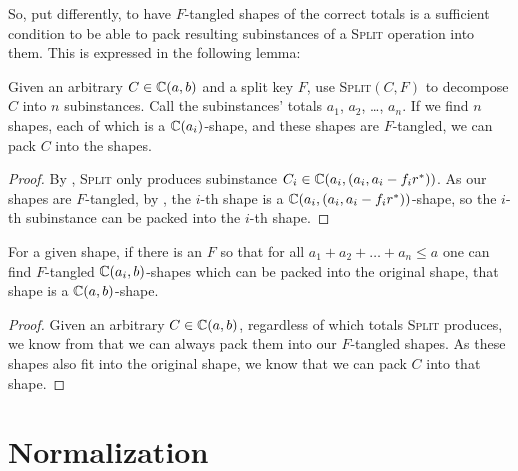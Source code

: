 \documentclass[%
    a4paper,              %
    style=screen,          %
    bibliography=totoc,   %
    nexus,                %
    lnum,                 %
    extramargin,          %
]{tubsbook}
\begin{document}
So, put differently, to have $F$-tangled shapes of the correct totals is a sufficient condition to be able to pack resulting subinstances of a \textsc{Split} operation into them. This is expressed in the following lemma:


\begin{lemma}\label{th:split-tangle}
    Given an arbitrary $C \in \mathbb{C}(a,b)$ and a split key $F$, use \textsc{Split}$(C,F)$ to decompose $C$ into $n$ subinstances. Call the subinstances' totals $a_1$, $a_2$, \dots, $a_n$. If we find $n$ shapes, each of which is a $\mathbb{C}(a_i)$-shape, and these shapes are $F$-tangled, we can pack $C$ into the shapes.
\end{lemma}

\begin{proof}
    By , \textsc{Split} only produces subinstance $C_i \in \mathbb{C}(a_i, (a_i, a_i-f_i r^*))$.
    As our shapes are $F$-tangled, by , the $i$-th shape is a $\mathbb{C}(a_i, (a_i, a_i - f_i r^*))$-shape, so the $i$-th subinstance can be packed into the $i$-th shape.
\end{proof}

\begin{theorem}
    For a given shape, if there is an $F$ so that for all $a_1 + a_2 + \dots + a_n \le a$ one can find $F$-tangled $\mathbb{C}(a_i, b)$-shapes which can be packed into the original shape, that shape is a $\mathbb{C}(a,b)$-shape.
\end{theorem}

\begin{proof}
    Given an arbitrary $C \in \mathbb{C}(a,b)$, regardless of which totals \textsc{Split} produces, we know from  that we can always pack them into our $F$-tangled shapes. As these shapes also fit into the original shape, we know that we can pack $C$ into that shape.
\end{proof}

\section{Normalization}
\end{document}
